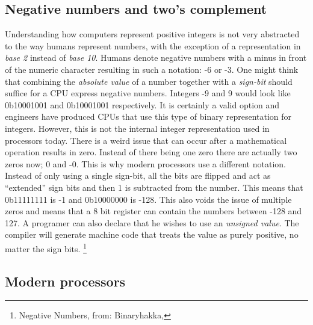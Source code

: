 \subsection{Negative numbers and two's complement}

Understanding how computers represent positive integers is not very abstracted to the way humans
represent numbers, with the exception of a representation in \textit{base 2} instead of \textit{base 10}. Humans
denote negative numbers with a minus in front of the numeric character resulting in such a notation: 
-6 or -3. One might think that combining the \textit{absolute value} of a number together with a \textit{sign-bit}
should suffice for a CPU express negative numbers. Integers -9 and 9 would look like 0b10001001 and
0b10001001 respectively. It is certainly a valid option and engineers have produced
CPUs that use this type of binary representation for integers. However, this is not the 
internal integer representation used in processors today. There is a weird issue that can occur after
a mathematical operation results in zero. Instead of there being one zero there are actually two 
zeros now; 0 and -0. This is why modern processors use a different notation. Instead of only using a
single sign-bit, all the bits are flipped and act as “extended” sign bits and then 1 is subtracted 
from the number. This means that 0b11111111 is -1 and 0b10000000 is -128. This also voids the issue 
of multiple zeros and means that a 8 bit register can contain the numbers between -128 and 127. 
A programer can also declare that he wishes to use an \textit{unsigned value}. The compiler will generate
machine code that treats the value as purely positive, no matter the sign bits. \footnote{Negative Numbers, from: Binaryhakka, \todayl}



\subsection{Modern processors}

